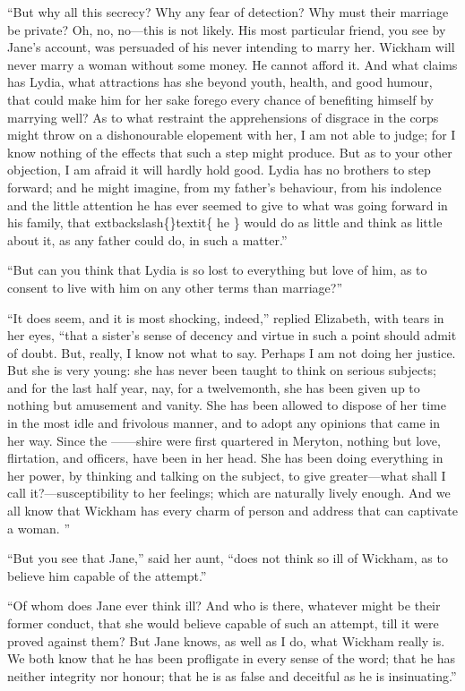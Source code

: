 \documentclass[10pt]{book}
\begin{document}
   “But why all this secrecy? Why any fear of detection? Why must their
marriage be private? Oh, no, no—this is not likely. His most particular
friend, you see by Jane’s account, was persuaded of his never intending
to marry her. Wickham will never marry a woman without some money. He
cannot afford it. And what claims has Lydia, what attractions has she
beyond youth, health, and good humour, that could make him for her sake
   forego every chance of benefiting himself by marrying well? As to what
restraint the apprehensions of disgrace in the corps might throw on a
dishonourable elopement with her, I am not able to judge; for I know
nothing of the effects that such a step might produce. But as to your
other objection, I am afraid it will hardly hold good. Lydia has no
brothers to step forward; and he might imagine, from my father’s
behaviour, from his indolence and the little attention he has ever
seemed to give to what was going forward in his family, that
   	extbackslash\{\}textit\{
    he
   \}
   would
do as little and think as little about it, as any father could do, in
such a matter.”
  

   “But can you think that Lydia is so lost to everything but love of him,
as to consent to live with him on any other terms than marriage?”
  

   “It does seem, and it is most shocking, indeed,” replied Elizabeth, with
tears in her eyes, “that a sister’s sense of decency and virtue in such
a point should admit of doubt. But, really, I know not what to say.
Perhaps I am not doing her justice. But she is very young: she has never
been taught to think on serious subjects; and for the last half year,
nay, for a twelvemonth, she has been given up to nothing but amusement
and vanity. She has been allowed to dispose of her time in the most idle
and frivolous manner, and to adopt any opinions that came in her way.
Since the ——shire were first quartered in Meryton, nothing but love,
flirtation, and officers, have been in her head. She has been doing
everything in her power, by thinking and talking on the subject, to give
greater—what shall I call it?—susceptibility to her feelings; which
are naturally lively enough. And we all know that Wickham has every
charm of person and address that can captivate a woman.
   ”
  

   “But you see that Jane,” said her aunt, “does not think so ill of
Wickham, as to believe him capable of the attempt.”
  

   “Of whom does Jane ever think ill? And who is there, whatever might be
their former conduct, that she would believe capable of such an attempt,
till it were proved against them? But Jane knows, as well as I do, what
Wickham really is. We both know that he has been profligate in every
sense of the word; that he has neither integrity nor honour; that he is
as false and deceitful as he is insinuating.”
  
\end{document}
